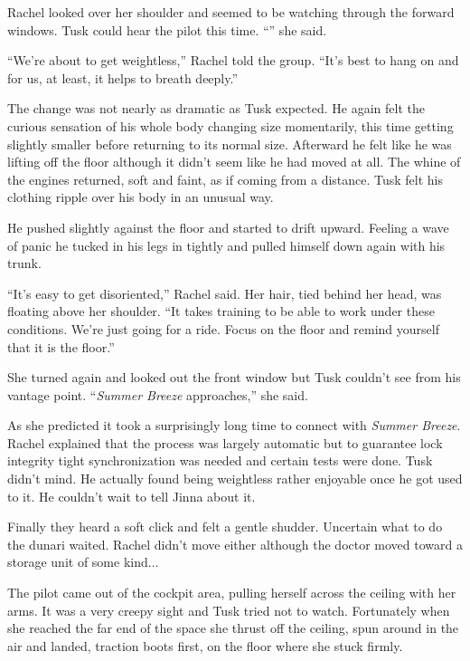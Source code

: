 Rachel looked over her shoulder and seemed to be watching through the forward windows. Tusk
could hear the pilot this time. ``'' she said.

``We're about to get weightless,'' Rachel told the group. ``It's best to hang on and for us, at
least, it helps to breath deeply.''

The change was not nearly as dramatic as Tusk expected. He again felt the curious sensation of
his whole body changing size momentarily, this time getting slightly smaller before returning to
its normal size. Afterward he felt like he was lifting off the floor although it didn't seem
like he had moved at all. The whine of the engines returned, soft and faint, as if coming from a
distance. Tusk felt his clothing ripple over his body in an unusual way.

He pushed slightly against the floor and started to drift upward. Feeling a wave of panic he
tucked in his legs in tightly and pulled himself down again with his trunk.

``It's easy to get disoriented,'' Rachel said. Her hair, tied behind her head, was floating
above her shoulder. ``It takes training to be able to work under these conditions. We're just
going for a ride. Focus on the floor and remind yourself that it is the floor.''

She turned again and looked out the front window but Tusk couldn't see from his vantage point.
``\textit{Summer Breeze} approaches,'' she said.

As she predicted it took a surprisingly long time to connect with \textit{Summer Breeze}.
Rachel explained that the process was largely automatic but to guarantee lock integrity tight
synchronization was needed and certain tests were done. Tusk didn't mind. He actually found
being weightless rather enjoyable once he got used to it. He couldn't wait to tell Jinna about
it.

Finally they heard a soft click and felt a gentle shudder. Uncertain what to do the dunari
waited. Rachel didn't move either although the doctor moved toward a storage unit of some
kind...


The pilot came out of the cockpit area, pulling herself across the ceiling with her arms. It was
a very creepy sight and Tusk tried not to watch. Fortunately when she reached the far end of the
space she thrust off the ceiling, spun around in the air and landed, traction boots first, on
the floor where she stuck firmly.

